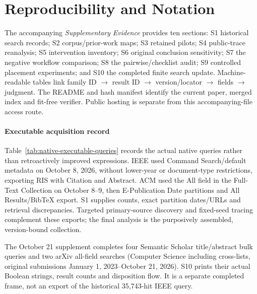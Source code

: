 \section{Reproducibility and Notation}\label{app:search}\label{app:notation}
The accompanying \emph{Supplementary Evidence} provides ten sections: S1 historical search records; S2 corpus/prior-work maps; S3 retained pilots; S4 public-trace reanalysis; S5 intervention inventory; S6 original conclusion sensitivity; S7 the negative workflow comparison; S8 the pairwise/checklist audit; S9 controlled placement experiments; and S10 the completed finite search update. Machine-readable tables link family ID $\to$ result ID $\to$ version/locator $\to$ fields $\to$ judgment. The README and hash manifest identify the current paper, merged index and fit-free verifier. Public hosting is separate from this accompanying-file access route.

\paragraph{Executable acquisition record}
Table~\ref{tab:native-executable-queries} records the actual native queries rather than retroactively improved expressions. IEEE used Command Search/default metadata on October 8, 2026, without lower-year or document-type restrictions, exporting RIS with Citation and Abstract. ACM used the All field in the Full-Text Collection on October 8--9, then E-Publication Date partitions and All Results/BibTeX export. S1 supplies counts, exact partition dates/URLs and retrieval discrepancies. Targeted primary-source discovery and fixed-seed tracing complement these exports; the final analysis is the purposively assembled, version-bound collection.


The October 21 supplement completes four Semantic Scholar title/abstract bulk queries and two arXiv all-field searches (Computer Science including cross-lists, original submissions January 1, 2023--October 21, 2026). S10 prints their actual Boolean strings, result counts and disposition flow. It is a separate completed frame, not an export of the historical 35,743-hit IEEE query.

